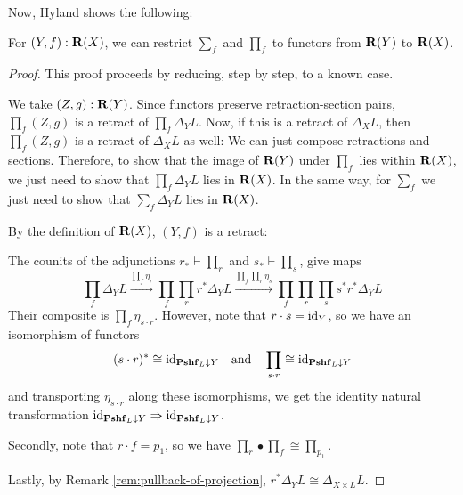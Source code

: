 Now, Hyland shows the following:
\begin{theorem}\label{thm:restrict-sum-product}
  For $ (Y, f) : \mathbf{R}(X) $, we can restrict $ \sum_f $ and $ \prod_f $ to functors from $ \mathbf{R}(Y) $ to $ \mathbf{R}(X) $.
\end{theorem}
\begin{proof}
  This proof proceeds by reducing, step by step, to a known case.

  We take $ (Z, g) : \mathbf{R}(Y) $. Since functors preserve retraction-section pairs, $ \prod_f(Z, g) $ is a retract of $ \prod_f \Delta_Y L $. Now, if this is a retract of $ \Delta_X L $, then $ \prod_f(Z, g) $ is a retract of $ \Delta_X L $ as well: We can just compose retractions and sections. Therefore, to show that the image of $ \mathbf{R}(Y) $ under $ \prod_f $ lies within $ \mathbf{R}(X) $, we just need to show that $ \prod_f \Delta_Y L $ lies in $ \mathbf{R}(X) $. In the same way, for $ \sum_f $ we just need to show that $ \sum_f \Delta_Y L $ lies in $ \mathbf{R}(X) $.

  By the definition of $ \mathbf{R}(X) $, $ (Y, f) $ is a retract:
  \begin{center}
  \end{center}

  The counits of the adjunctions $ r_* \vdash \prod_r $ and $ s_* \vdash \prod_s $, give maps
  \[
    \prod_f \Delta_Y L \xrightarrow{\prod_f \eta_r}
    \prod_f \prod_r r^* \Delta_Y L \xrightarrow{\prod_f \prod_r \eta_s}
    \prod_f \prod_r \prod_s s^* r^* \Delta_Y L
  \]
  Their composite is $ \prod_f \eta_{s \cdot r} $. However, note that $ r \cdot s = \text{id}_{Y} $, so we have an isomorphism of functors
  \[ (s \cdot r)^* \cong \text{id}_{\mathbf{Pshf}_{L} \downarrow Y} \quad \text{and} \quad \prod_{s \cdot r} \cong \text{id}_{\mathbf{Pshf}_{L} \downarrow Y} \]
  and transporting $ \eta_{s \cdot r} $ along these isomorphisms, we get the identity natural transformation $ \text{id}_{\mathbf{Pshf}_{L} \downarrow Y} \Rightarrow \text{id}_{\mathbf{Pshf}_{L} \downarrow Y} $.

  Secondly, note that $ r \cdot f = p_1 $, so we have $ \prod_r \bullet \prod_f \cong \prod_{p_1} $.

  Lastly, by Remark \ref{rem:pullback-of-projection}, $ r^* \Delta_Y L \cong \Delta_{X \times L} L $.


\end{proof}
